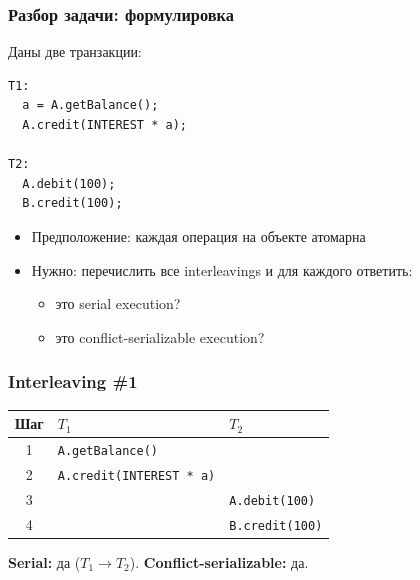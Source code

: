 \documentclass{beamer}
\begin{document}
\begin{frame}[fragile]
\frametitle{Разбор задачи: формулировка}

\small
Даны две транзакции:

\begin{verbatim}
T1:
  a = A.getBalance();
  A.credit(INTEREST * a);

T2:
  A.debit(100);
  B.credit(100);
\end{verbatim}

\normalsize
\begin{itemize}
  \item Предположение: каждая операция на объекте атомарна
  \item Нужно: перечислить все interleavings и для каждого ответить:
  \begin{itemize}
    \item это serial execution?
    \item это conflict-serializable execution?
  \end{itemize}
\end{itemize}

\end{frame}

\begin{frame}
\frametitle{Interleaving \#1}

\vspace{0.5em}
\normalsize
\begin{center}
\begin{tabular}{c|p{}|p{}}
\textbf{Шаг} & \textbf{$T_1$} & \textbf{$T_2$} \\ \hline
1 & \texttt{A.getBalance()} &  \\
2 & \texttt{A.credit(INTEREST * a)} &  \\
3 &  & \texttt{A.debit(100)} \\
4 &  & \texttt{B.credit(100)} \\
\end{tabular}
\end{center}

\vspace{0.4em}
\pause
\textbf{Serial:} да ($T_1 \rightarrow T_2$). \quad
\pause
\textbf{Conflict-serializable:} да.

\end{frame}
\end{document}
